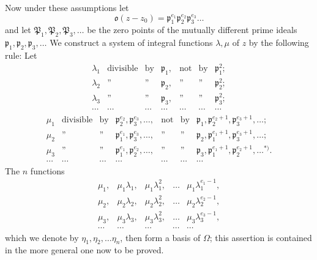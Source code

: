 \documentclass{article}
\begin{document}
Now under these assumptions let
\[ \mathfrak{o}(z-z_{0}) = \mathfrak{p}_{1}^{e_{1}}\mathfrak{p}_{2}^{e_{2}}\mathfrak{p}_{3}^{e_{3}}\ldots \]
and let $\mathfrak{P}_{1}, \mathfrak{P}_{2}, \mathfrak{P}_{3}, \ldots$ be the zero points of the mutually different prime ideals $\mathfrak{p}_{1}, \mathfrak{p}_{2}, \mathfrak{p}_{3}, \ldots$ We construct a system of integral functions $\lambda, \mu$ of $z$ by the following rule: Let
\[ \begin{matrix} \lambda_{1} & \text{divisible} & \text{by} & \mathfrak{p}_{1}, & \text{not} & \text{by} & \mathfrak{p}_{1}^{2}; \\ \lambda_{2} & \text{''} & \text{''} & \mathfrak{p}_{2}, & \text{''} & \text{''} & \mathfrak{p}_{2}^{2}; \\ \lambda_{3} & \text{''} & \text{''} & \mathfrak{p}_{3}, & \text{''} & \text{''} & \mathfrak{p}_{3}^{2}; \\ \cdots & \cdots & \cdots & \cdots & \cdots & \cdots & \cdots \end{matrix} \]
\[ \begin{matrix} \mu_{1} & \text{divisible} & \text{by} & \mathfrak{p}_{2}^{e_{2}}, \mathfrak{p}_{3}^{e_{3}}, \ldots, & \text{not} & \text{by} & \mathfrak{p}_{1}, \mathfrak{p}_{2}^{e_{2}+1}, \mathfrak{p}_{3}^{e_{3}+1}, \ldots; \\ \mu_{2} & \text{''} & \text{''} & \mathfrak{p}_{1}^{e_{1}}, \mathfrak{p}_{3}^{e_{3}}, \ldots, & \text{''} & \text{''} & \mathfrak{p}_{2}, \mathfrak{p}_{1}^{e_{1}+1}, \mathfrak{p}_{3}^{e_{3}+1}, \ldots; \\ \mu_{3} & \text{''} & \text{''} & \mathfrak{p}_{1}^{e_{1}}, \mathfrak{p}_{2}^{e_{2}}, \ldots, & \text{''} & \text{''} & \mathfrak{p}_{3}, \mathfrak{p}_{1}^{e_{1}+1}, \mathfrak{p}_{2}^{e_{2}+1}, \ldots{}^{*)}. \\ \cdots & \cdots & \cdots & \cdots & \cdots & \cdots & \cdots \end{matrix} \]
The $n$ functions
\[ \begin{matrix} \mu_{1}, & \mu_{1}\lambda_{1}, & \mu_{1}\lambda_{1}^{2}, & \ldots & \mu_{1}\lambda_{1}^{e_{1}-1}, \\ \mu_{2}, & \mu_{2}\lambda_{2}, & \mu_{2}\lambda_{2}^{2}, & \ldots & \mu_{2}\lambda_{2}^{e_{2}-1}, \\ \mu_{3}, & \mu_{3}\lambda_{3}, & \mu_{3}\lambda_{3}^{2}, & \ldots & \mu_{3}\lambda_{3}^{e_{3}-1}, \\ \cdots & \cdots & \cdots & \cdots & \cdots \end{matrix} \]
which we denote by $\eta_{1}, \eta_{2}, \ldots \eta_{n}$, then form a basis of $\Omega$; this assertion is contained in the more general one now to be proved.
\end{document}
